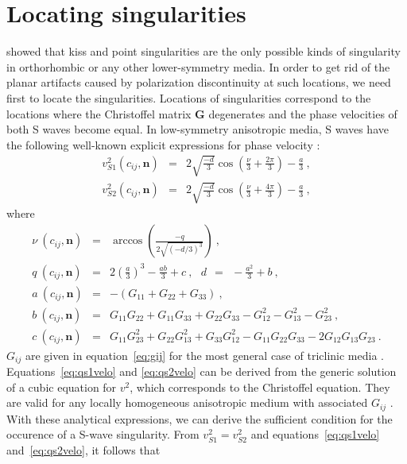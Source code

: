 \section{Locating singularities}
\cite{cramp1984,cramp1991} showed that kiss and point singularities are the only possible kinds of singularity in orthorhombic or any other lower-symmetry media. In order to get rid of the planar artifacts caused by polarization discontinuity at such locations, we need first to locate the singularities. Locations of singularities correspond to the locations where the Christoffel matrix $\mathbf{G}$ degenerates and the phase velocities of both S waves become equal. In low-symmetry anisotropic media, S waves have the following well-known explicit expressions for phase velocity \cite[]{helbig,tsvankinortho,tsvankinbook}:
\begin{eqnarray}
\label{eq:qs1velo}
v^2_{S1} (c_{ij},\mathbf{n}) & = & 2\sqrt{\frac{-d}{3}}\cos(\frac{\nu}{3}+\frac{2\pi}{3})-\frac{a}{3} ~,\\
\label{eq:qs2velo}
v^2_{S2} (c_{ij},\mathbf{n}) & = & 2\sqrt{\frac{-d}{3}}\cos(\frac{\nu}{3}+\frac{4\pi}{3})-\frac{a}{3} ~,
\end{eqnarray}
where
\begin{eqnarray}
\nonumber
\nu~(c_{ij},\mathbf{n}) & = & \arccos \left(\frac{-q}{2\sqrt{(-d/3)^3}}\right)~,\\
\nonumber
q~(c_{ij},\mathbf{n}) & = & 2\left(\frac{a}{3}\right)^3 - \frac{ab}{3}+c~,~~~d~~=~~-\frac{a^2}{3} + b~,\\
\nonumber
a~(c_{ij},\mathbf{n}) & = & -(G_{11}+G_{22}+G_{33})~,\\
\nonumber
b~(c_{ij},\mathbf{n}) & = & G_{11}G_{22}+G_{11}G_{33}+G_{22}G_{33}-G^2_{12}-G^2_{13}-G^2_{23}~,\\
\nonumber
c~(c_{ij},\mathbf{n}) & = & G_{11}G^2_{23}+G_{22}G^2_{13}+G_{33}G^2_{12}-G_{11}G_{22}G_{33}-2G_{12}G_{13}G_{23}~.
\end{eqnarray}
$G_{ij}$ are given in equation~\ref{eq:gij} for the most general case of triclinic media . Equations~\ref{eq:qs1velo} and \ref{eq:qs2velo} can be derived from the generic solution of a cubic equation for $v^2$, which corresponds to the Christoffel equation. They are valid for any locally homogeneous anisotropic medium with associated $G_{ij}$ \cite[]{helbig}. With these analytical expressions, we can derive the sufficient condition for the occurence of a S-wave singularity. From $v^2_{S1} = v^2_{S2}$ and equations~\ref{eq:qs1velo} and~\ref{eq:qs2velo}, it follows that 
